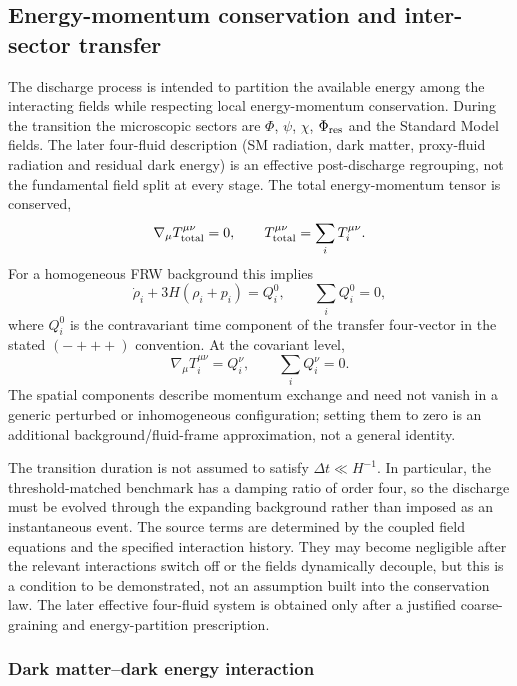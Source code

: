 \documentclass[epj]{svjour}
\begin{document}
\subsection{Energy-momentum conservation and inter-sector transfer}
\label{sec:energy_momentum_conservation}

The discharge process is intended to partition the available energy
among the interacting fields while respecting local energy-momentum
conservation. During the transition the microscopic sectors are
$\Phi$, $\psi$, $\chi$, $\Phi_{\rm res}$ and the Standard Model
fields. The later four-fluid description (SM radiation, dark matter,
proxy-fluid radiation and residual dark energy) is an effective
post-discharge regrouping, not the fundamental field split at every
stage. The total energy-momentum tensor is conserved,
\begin{equation}
\nabla_\mu T^{\mu\nu}_{\rm total}=0,
\qquad
T^{\mu\nu}_{\rm total}=\sum_i T_i^{\mu\nu}.
\end{equation}
For a homogeneous FRW background this implies
\begin{equation}
\dot\rho_i+3H(\rho_i+p_i)=Q_i^0,
\qquad
\sum_i Q_i^0=0,
\end{equation}
where $Q_i^0$ is the contravariant time component of the transfer
four-vector in the stated $(-+++)$ convention. At the covariant level,
\begin{equation}
\nabla_\mu T_i^{\mu\nu}=Q_i^\nu,
\qquad
\sum_i Q_i^\nu=0.
\end{equation}
The spatial components describe momentum exchange and need not vanish
in a generic perturbed or inhomogeneous configuration; setting them
to zero is an additional background/fluid-frame approximation, not
a general identity.

The transition duration is not assumed to satisfy
$\Delta t\ll H^{-1}$. In particular, the threshold-matched benchmark
has a damping ratio of order four, so the discharge must be evolved
through the expanding background rather than imposed as an
instantaneous event. The source terms are determined by the coupled
field equations and the specified interaction history. They may become
negligible after the relevant interactions switch off or the fields
dynamically decouple, but this is a condition to be demonstrated, not
an assumption built into the conservation law. The later effective
four-fluid system is obtained only after a justified coarse-graining
and energy-partition prescription.

\subsubsection{Dark matter--dark energy interaction}
\label{sec:dm_de_interaction}
\end{document}

